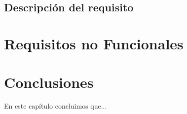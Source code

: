 \subsection{Descripción del requisito}






\section{Requisitos no Funcionales}





\section{Conclusiones}
En este capítulo concluimos que...
